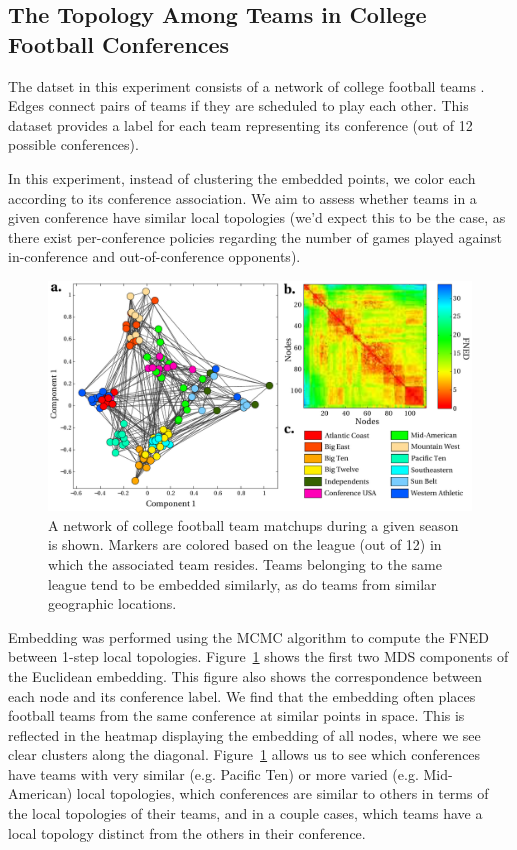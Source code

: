 \documentclass{article}
\begin{document}
\subsection{The Topology Among Teams in College Football Conferences}
The datset in this experiment consists of a network of college football teams \cite{newman2006finding}. Edges connect pairs of teams if they are scheduled to play each other. This dataset provides a label for each team representing its conference (out of 12 possible conferences). 

In this experiment, instead of clustering the embedded points, we color each according to its conference association. We aim to assess whether teams in a given conference have similar local topologies (we'd expect this to be the case, as there exist per-conference policies regarding the number of games played against in-conference and out-of-conference opponents).

\begin{figure}[h!tbp]
  \centering               
  \includegraphics[width=1\textwidth]{fig/fig4.pdf}
  \caption{A network of college football team matchups during a given season is shown. Markers are colored based on the league (out of 12) in which the associated team resides. Teams belonging to the same league tend to be embedded similarly, as do teams from similar geographic locations.}
  \label{fig:footballTeams}
\end{figure}

Embedding was performed using the MCMC algorithm to compute the FNED between 1-step local topologies. Figure~\ref{fig:footballTeams} shows the first two MDS components of the Euclidean embedding. This figure also shows the correspondence between each node and its conference label. We find that the embedding often places football teams from the same conference at similar points in space. This is reflected in the heatmap displaying the embedding of all nodes, where we see clear clusters along the diagonal. Figure~\ref{fig:footballTeams} allows us to see which conferences have teams with very similar (e.g. Pacific Ten) or more varied (e.g. Mid-American) local topologies, which conferences are similar to others in terms of the local topologies of their teams, and in a couple cases, which teams have a local topology distinct from the others in their conference. 
\end{document}
